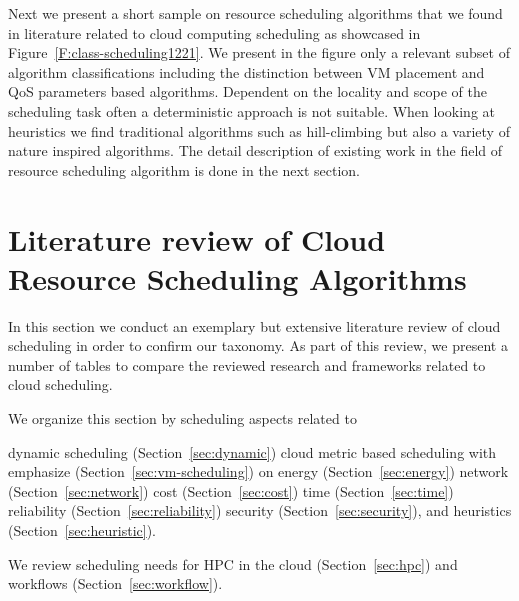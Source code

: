 \documentclass[final,5p,times,twocolumn]{elsarticle}
\begin{document}
Next we present a short sample on resource scheduling algorithms that
we found in literature related to cloud computing scheduling as
showcased in Figure~\ref{F:class-scheduling1221}. We present in the
figure only a relevant subset of algorithm classifications including
the distinction between VM placement and QoS parameters based
algorithms. Dependent on the locality and scope of the scheduling task
often a deterministic approach is not suitable. When looking at
heuristics \cite{vivekanandan2011study} we find traditional algorithms
such as hill-climbing but also a variety of nature inspired
algorithms. The detail description of existing work in the field of
resource scheduling algorithm is done in the next section.







\section{Literature review of Cloud Resource Scheduling Algorithms}\label{sec:literature}



In this section we conduct an exemplary but extensive literature
review of cloud scheduling in order to confirm our taxonomy. As part
of this review, we present a number of tables to compare the reviewed
research and frameworks related to cloud scheduling.

We organize this section by scheduling aspects related to 

dynamic scheduling (Section~\ref{sec:dynamic})
cloud metric based scheduling with emphasize (Section~\ref{sec:vm-scheduling}) on 
energy (Section~\ref{sec:energy})
network (Section~\ref{sec:network})
cost (Section~\ref{sec:cost})
time (Section~\ref{sec:time})
reliability (Section~\ref{sec:reliability})
security (Section~\ref{sec:security}),
and heuristics (Section~\ref{sec:heuristic}).

We review scheduling needs for 
HPC in the cloud (Section~\ref{sec:hpc}) and 
workflows (Section~\ref{sec:workflow}).
\end{document}
